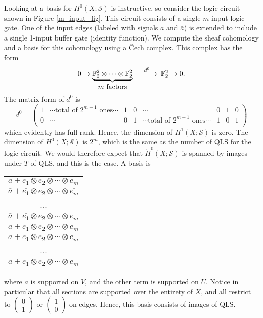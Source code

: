 \documentclass{amsart}
\theoremstyle{plain}
\theoremstyle{definition}
\begin{document}
Looking at a basis for $H^0(X;\mathcal{S})$ is instructive, so
consider the logic circuit shown in Figure \ref{m_input_fig}.
This circuit consists of a single $m$-input logic gate.  One of the
input edges (labeled with signals $a$ and $\bar{a}$) is extended to
include a single 1-input buffer gate (identity function).  We compute
the sheaf cohomology and a basis for this cohomology using a \v{C}ech
complex.  This complex has the form
\begin{equation*}
\begin{CD}
0 \to \underbrace{\mathbb{F}_2^2 \otimes \cdots \otimes
  \mathbb{F}_2^2}_{\mbox{$m$ factors}} @>d^0>> \mathbb{F}_2^2
\to 0.
\end{CD}
\end{equation*}
The matrix form of $d^0$ is
\begin{equation*}
d^0=\begin{pmatrix}
1 & \cdots \text{total of } 2^{m-1} \text{ ones} \cdots & 1 & 0 & \cdots & 0 & 1 & 0\\
0 & \cdots & 0 & 1 & \cdots \text{total of } 2^{m-1} \text{ ones} \cdots & 1 & 0 & 1\\
\end{pmatrix}
\end{equation*}
which evidently has full rank.  Hence, the dimension of
$H^1(X;\mathcal{S})$ is zero.  The dimension of
$H^0(X;\mathcal{S})$ is $2^m$, which is the same as the number of QLS
for the logic circuit.  We would therefore expect that
$\check{H}^0(X;\mathcal{S})$ is spanned by images under $T$ of QLS, and this
is the case.  A basis is
\begin{center}
\begin{tabular}{c}
$\overline{a}+\overline{e_1} \otimes \overline{e_2} \otimes \cdots
\otimes \overline{e_m}$\\
$\overline{a}+\overline{e_1} \otimes e_2 \otimes \cdots
\otimes \overline{e_m}$\\
...\\
$\overline{a}+\overline{e_1} \otimes e_2 \otimes \cdots \otimes e_m$\\
$a+e_1 \otimes \overline{e_2} \otimes \cdots
\otimes \overline{e_m}$\\
$a+e_1 \otimes e_2 \otimes \cdots
\otimes \overline{e_m}$\\
...\\
$a+e_1 \otimes e_2 \otimes \cdots \otimes e_m$\\
\end{tabular}
\end{center}
where $a$ is supported on $V$, and the other term is
supported on $U$.  Notice in particular that all sections are
supported over the entirety of $X$, and all restrict to
$\left(\begin{smallmatrix}0\\1\end{smallmatrix}\right)$ or
  $\left(\begin{smallmatrix}1\\0\end{smallmatrix}\right)$ on edges.  Hence, this basis
    consists of images of QLS.
\end{document}
